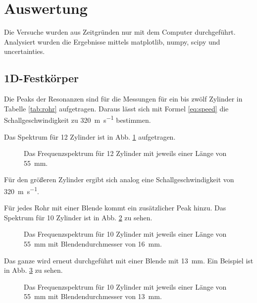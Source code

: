 \section{Auswertung}
\label{sec:Auswertung}

Die Versuche wurden aus Zeitgründen nur mit dem Computer durchgeführt. Analysiert wurden die Ergebnisse mittels matplotlib, numpy, scipy und uncertainties.

\subsection{1D-Festkörper}

Die Peaks der Resonanzen sind für die Messungen für ein bis zwölf Zylinder in Tabelle \ref{tab:rohr} aufgetragen. 
Daraus lässt sich mit Formel \ref{eq:speed} die Schallgeschwindigkeit zu \SI{320}{\meter\per\second} bestimmen. 

Das Spektrum für \num{12} Zylinder ist in Abb. \ref{fig:spec12} aufgetragen.

\begin{figure}
    \centering
    \caption{Das Frequenzspektrum für 12 Zylinder mit jeweils einer Länge von \SI{55}{\milli\metre}.}
    \label{fig:spec12}
\end{figure}

Für den größeren Zylinder ergibt sich analog eine Schallgeschwindigkeit von \SI{320}{\meter\per\second}.

Für jedes Rohr mit einer Blende kommt ein zusätzlicher Peak hinzu. 
Das Spektrum für \num{10} Zylinder ist in Abb. \ref{fig:spec10} zu sehen. 

\begin{figure}
    \centering
    \caption{Das Frequenzspektrum für 10 Zylinder mit jeweils einer Länge von \SI{55}{\milli\metre} mit Blendendurchmesser von \SI{16}{\milli\metre}.}
    \label{fig:spec10}
\end{figure}

Das ganze wird erneut durchgeführt mit einer Blende mit \SI{13}{\milli\meter}. Ein Beispiel ist in Abb. \ref{fig:spec10_13} zu sehen. 

\begin{figure}
    \centering
    \caption{Das Frequenzspektrum für 10 Zylinder mit jeweils einer Länge von \SI{55}{\milli\metre} mit Blendendurchmesser von \SI{13}{\milli\metre}.}
    \label{fig:spec10_13}
\end{figure}

